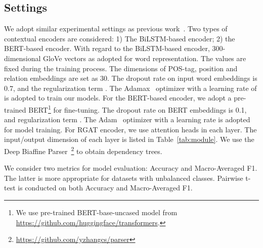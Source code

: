 \documentclass[journal]{IEEEtran}
\begin{document}
	\subsection{Settings}
	We adopt similar experimental settings as previous work~\cite{sun-etal-2019-aspect,huang-carley-2019-syntax}. 
	Two types of contextual encoders are considered: 1) The BiLSTM-based encoder; 2) the BERT-based encoder.
	With regard to the BiLSTM-based encoder, 300-dimensional GloVe vectors as adopted for word representation. The values are fixed during the training process.
	The dimensions of POS-tag, position and relation embeddings are set as 30.
	The dropout rate on input word embeddings is 0.7, and the  regularization term .
	The Adamax~\cite{Adam} optimizer with a learning rate of  is adopted to train our models.
	For the BERT-based encoder, we adopt a pre-trained BERT\footnote{We use pre-trained BERT-base-uncased model from \url{https://github.com/huggingface/transformers}.} for fine-tuning.
	The dropout rate on BERT embeddings is 0.1, and regularization term .
	The Adam~\cite{Adam} optimizer with a learning rate  is adopted for model training.
	For RGAT encoder, we use  attention heads in each layer. 
	The input/output dimension of each layer is listed in Table~\ref{tab:module}. 
	We use the Deep Biaffine Parser~\cite{dozat2017deep}\footnote{\url{https://github.com/yzhangcs/parser}} to obtain dependency trees.
	
	We consider two metrics for model evaluation: Accuracy and Macro-Averaged F1. 
	The latter is more appropriate for datasets with unbalanced classes.
	Pairwise t-test is conducted on both Accuracy and Macro-Averaged F1.
	
	
\end{document}
